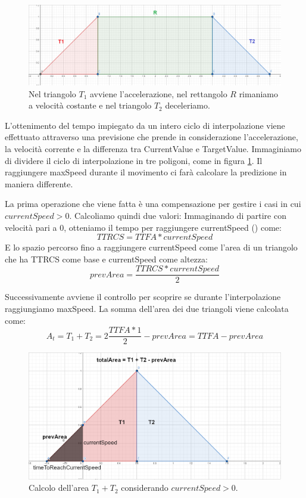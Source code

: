 \documentclass[main.tex]{subfiles}
\begin{document}
\begin{figure}
    \centering
    \captionsetup{justification=centering}
    \includegraphics[scale=0.25]{img/interpolazione/movementThreeParts.png}
    \caption{Nel triangolo $T_1$ avviene l'accelerazione, nel rettangolo $R$ rimaniamo a velocità costante e nel triangolo $T_2$ deceleriamo.}
    \label{fig:4_movementThreeParts}
\end{figure}
\noindent L'ottenimento del tempo impiegato da un intero ciclo di interpolazione viene effettuato attraverso una previsione che prende in considerazione l'accelerazione, la velocità corrente e la differenza tra CurrentValue e TargetValue. Immaginiamo di dividere il ciclo di interpolazione in tre poligoni, come in figura \ref{fig:4_movementThreeParts}. Il raggiungere maxSpeed durante il movimento ci farà calcolare la predizione in maniera differente. \newline

La prima operazione che viene fatta è una compensazione per gestire i casi in cui $currentSpeed > 0$. Calcoliamo quindi due valori: Immaginando di partire con velocità pari a 0, otteniamo il tempo per raggiungere currentSpeed () come:
\[TTRCS = TTFA * currentSpeed\]
E lo spazio percorso fino a raggiungere currentSpeed come l'area di un triangolo che ha TTRCS come base e currentSpeed come altezza:
\[prevArea = \frac{TTRCS * currentSpeed}{2}\]

Successivamente avviene il controllo per scoprire se durante l'interpolazione raggiungiamo maxSpeed. La somma dell'area dei due triangoli viene calcolata come:
\[A_t = T_1 + T_2 = 2\frac{TTFA * 1}{2} - prevArea = TTFA - prevArea\]
\begin{figure}[H]
    \centering
    \includegraphics[width=.9\linewidth]{img/interpolazione/speedCapTriangleAreaSplice.png}
    \caption{Calcolo dell'area $T_1 + T_2$ considerando $currentSpeed > 0$.}
    \label{fig:4_speedCapTriangleAreaSplice}
\end{figure}
\end{document}
